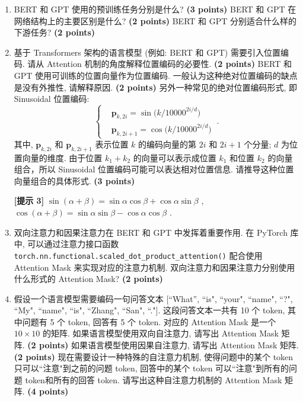 \documentclass[8pt]{article}
\newcommand{\points}[1]{\textbf{(#1 points)}}
\begin{document}
{\color{gray}\begin{enumerate}
    \item BERT 和 GPT 使用的预训练任务分别是什么? \points{3} BERT 和 GPT 在网络结构上的主要区别是什么? \points{2} BERT 和 GPT 分别适合什么样的下游任务? \points{2}
    \item 基于 Transformers 架构的语言模型 (例如: BERT 和 GPT) 需要引入位置编码. 请从 Attention 机制的角度解释位置编码的必要性. \points{2} BERT 和 GPT 使用可训练的位置向量作为位置编码. 一般认为这种绝对位置编码的缺点是没有外推性, 请解释原因. \points{2} 另外一种常见的绝对位置编码形式, 即 Sinusoidal 位置编码:
    \begin{equation}
    \left\{
    \begin{aligned}
    &\boldsymbol{p}_{k, 2i} = \sin\Big( k/10000^{2i/d} \Big) \\ 
    &\boldsymbol{p}_{k, 2i+1} = \cos\Big( k/10000^{2i/d} \Big) 
    \end{aligned}
    \right. \ .
    \end{equation} 
    其中, $\boldsymbol{p}_{k, 2i}$ 和 $\boldsymbol{p}_{k, 2i+1}$ 表示位置 $k$ 的编码向量的第 $2i$ 和 $2i+1$ 个分量; $d$ 为位置向量的维度. 由于位置 $k_1+k_2$ 的向量可以表示成位置 $k_1$ 和位置 $k_2$ 的向量组合，所以 Sinusoidal 位置编码可能可以表达相对位置信息. 请推导这种位置向量组合的具体形式. \points{3}

    \textbf{[提示 3]} $\sin(\alpha+\beta) = \sin\alpha\cos\beta+\cos\alpha\sin\beta$ , $\cos(\alpha+\beta) = \sin\alpha\sin\beta-\cos\alpha\cos\beta$ .
    
    \item 双向注意力和因果注意力在 BERT 和 GPT 中发挥着重要作用. 在 PyTorch 库中, 可以通过注意力接口函数 \texttt{torch.nn.functional.scaled\_dot\_product\_attention()} 配合使用 Attention Mask 来实现对应的注意力机制. 双向注意力和因果注意力分别使用什么形式的 Attention Mask? \points{2} 
    \item 假设一个语言模型需要编码一句问答文本 [``What'', ``is", ``your", ``name", ``?", ``My", ``name", ``is", ``Zhang", ``San", ``."]. 这段问答文本一共有 10 个 token, 其中问题有 5 个 token, 回答有 5 个 token. 对应的 Attention Mask 是一个 $10\times 10$ 的矩阵. 如果语言模型使用双向自注意力, 请写出 Attention Mask 矩阵. \points{2} 如果语言模型使用因果自注意力, 请写出 Attention Mask 矩阵. \points{2} 现在需要设计一种特殊的自注意力机制, 使得问题中的某个 token 只可以``注意"到之前的问题 token, 回答中的某个 token 可以``注意"到所有的问题 token和所有的回答 token. 请写出这种自注意力机制的 Attention Mask 矩阵. \points{4}
\end{enumerate}}
\end{document}
